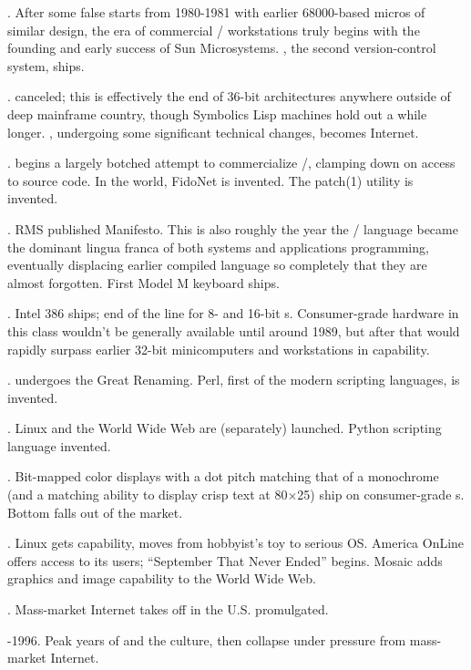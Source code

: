 .
After some false starts from 1980-1981 with earlier 68000-based micros of
similar design, the era of commercial \UNIX/ workstations truly begins with the
founding and early success of Sun Microsystems. , the second version-control
system, ships.

.
 canceled; this is effectively the end of 36-bit architectures anywhere
outside of deep mainframe country, though Symbolics Lisp machines hold out a
while longer. , undergoing some significant technical changes, becomes
Internet.

.
 begins a largely botched attempt to commercialize \UNIX/, clamping down on
access to source code. In the  world, FidoNet is invented. The patch(1)
utility is invented.

.
RMS published  Manifesto. This is also roughly the year the \CEE/ language
became the dominant lingua franca of both systems and applications programming,
eventually displacing earlier compiled language so completely that they are
almost forgotten. First Model M keyboard ships.

.
Intel 386 ships; end of the line for 8- and 16-bit s. Consumer-grade hardware
in this class wouldn't be generally available until around 1989, but after that
would rapidly surpass earlier 32-bit minicomputers and workstations in
capability.

.
 undergoes the Great Renaming. Perl, first of the modern scripting
languages, is invented.

.
Linux and the World Wide Web are (separately) launched. Python scripting
language invented.

.
Bit-mapped color displays with a dot pitch matching that of a monochrome 
(and a matching ability to display crisp text at 80$\times$25) ship on consumer-grade
s. Bottom falls out of the  market.

.
Linux gets  capability, moves from hobbyist's toy to serious OS. America
OnLine offers  access to its users; ``September That Never Ended'' begins.
Mosaic adds graphics and image capability to the World Wide Web.

.
Mass-market Internet takes off in the U.S\hbox{}.  promulgated.

-1996.
Peak years of  and the  culture, then collapse under pressure
from mass-market Internet.

